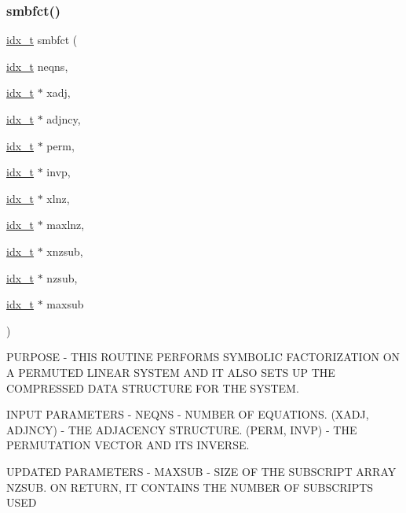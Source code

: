 \subsubsection{\texorpdfstring{smbfct()}{smbfct()}}
{\footnotesize\ttfamily \hyperlink{a00876_aaa5262be3e700770163401acb0150f52}{idx\+\_\+t} smbfct (\begin{DoxyParamCaption}\item[{\hyperlink{a00876_aaa5262be3e700770163401acb0150f52}{idx\+\_\+t}}]{neqns,  }\item[{\hyperlink{a00876_aaa5262be3e700770163401acb0150f52}{idx\+\_\+t} $\ast$}]{xadj,  }\item[{\hyperlink{a00876_aaa5262be3e700770163401acb0150f52}{idx\+\_\+t} $\ast$}]{adjncy,  }\item[{\hyperlink{a00876_aaa5262be3e700770163401acb0150f52}{idx\+\_\+t} $\ast$}]{perm,  }\item[{\hyperlink{a00876_aaa5262be3e700770163401acb0150f52}{idx\+\_\+t} $\ast$}]{invp,  }\item[{\hyperlink{a00876_aaa5262be3e700770163401acb0150f52}{idx\+\_\+t} $\ast$}]{xlnz,  }\item[{\hyperlink{a00876_aaa5262be3e700770163401acb0150f52}{idx\+\_\+t} $\ast$}]{maxlnz,  }\item[{\hyperlink{a00876_aaa5262be3e700770163401acb0150f52}{idx\+\_\+t} $\ast$}]{xnzsub,  }\item[{\hyperlink{a00876_aaa5262be3e700770163401acb0150f52}{idx\+\_\+t} $\ast$}]{nzsub,  }\item[{\hyperlink{a00876_aaa5262be3e700770163401acb0150f52}{idx\+\_\+t} $\ast$}]{maxsub }\end{DoxyParamCaption})}

P\+U\+R\+P\+O\+SE -\/ T\+H\+IS R\+O\+U\+T\+I\+NE P\+E\+R\+F\+O\+R\+MS S\+Y\+M\+B\+O\+L\+IC F\+A\+C\+T\+O\+R\+I\+Z\+A\+T\+I\+ON ON A P\+E\+R\+M\+U\+T\+ED L\+I\+N\+E\+AR S\+Y\+S\+T\+EM A\+ND IT A\+L\+SO S\+E\+TS UP T\+HE C\+O\+M\+P\+R\+E\+S\+S\+ED D\+A\+TA S\+T\+R\+U\+C\+T\+U\+RE F\+OR T\+HE S\+Y\+S\+T\+EM.

I\+N\+P\+UT P\+A\+R\+A\+M\+E\+T\+E\+RS -\/ N\+E\+Q\+NS -\/ N\+U\+M\+B\+ER OF E\+Q\+U\+A\+T\+I\+O\+NS. (X\+A\+DJ, A\+D\+J\+N\+CY) -\/ T\+HE A\+D\+J\+A\+C\+E\+N\+CY S\+T\+R\+U\+C\+T\+U\+RE. (P\+E\+RM, I\+N\+VP) -\/ T\+HE P\+E\+R\+M\+U\+T\+A\+T\+I\+ON V\+E\+C\+T\+OR A\+ND I\+TS I\+N\+V\+E\+R\+SE.

U\+P\+D\+A\+T\+ED P\+A\+R\+A\+M\+E\+T\+E\+RS -\/ M\+A\+X\+S\+UB -\/ S\+I\+ZE OF T\+HE S\+U\+B\+S\+C\+R\+I\+PT A\+R\+R\+AY N\+Z\+S\+UB. ON R\+E\+T\+U\+RN, IT C\+O\+N\+T\+A\+I\+NS T\+HE N\+U\+M\+B\+ER OF S\+U\+B\+S\+C\+R\+I\+P\+TS U\+S\+ED

